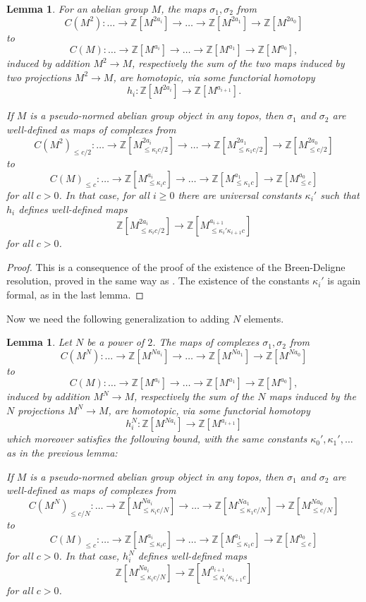 \documentclass[11pt]{amsbook}
\numberwithin{equation}{section}
\numberwithin{theorem}{section}
\newtheorem{lemma}[theorem]{Lemma}
\theoremstyle{definition}
\begin{document}
\begin{lemma}\label{lem:basehomotopy} For an abelian group $M$, the maps $\sigma_1,\sigma_2$ from
\[
C(M^2): \ldots \to \mathbb Z[M^{2a_i}]\to\ldots\to\mathbb Z[M^{2a_1}]\to\mathbb Z[M^{2a_0}]
\]
to
\[
C(M): \ldots \to \mathbb Z[M^{a_i}]\to\ldots\to\mathbb Z[M^{a_1}]\to\mathbb Z[M^{a_0}],
\]
induced by addition $M^2\to M$, respectively the sum of the two maps induced by two projections $M^2\to M$, are homotopic, via some functorial homotopy
\[
h_i: \mathbb Z[M^{2a_i}]\to \mathbb Z[M^{a_{i+1}}].
\]

If $M$ is a pseudo-normed abelian group object in any topos, then $\sigma_1$ and $\sigma_2$ are well-defined as maps of complexes from
\[
C(M^2)_{\leq c/2}: \ldots \to \mathbb Z[M^{2a_i}_{\leq \kappa_ic/2}]\to\ldots\to\mathbb
Z[M^{2a_1}_{\leq \kappa_1c/2}]\to\mathbb Z[M^{2a_0}_{\leq c/2}]
\]
to
\[
C(M)_{\leq c}: \ldots \to \mathbb Z[M^{a_i}_{\leq \kappa_ic}]\to\ldots\to\mathbb
Z[M^{a_1}_{\leq \kappa_1c}]\to\mathbb Z[M^{a_0}_{\leq c}]
\]
for all $c>0$. In that case, for all $i\geq 0$ there are universal constants $\kappa_i'$ such that $h_i$ defines well-defined maps
\[
\mathbb Z[M^{2a_i}_{\leq \kappa_ic/2}]\to \mathbb Z[M^{a_{i+1}}_{\leq
\kappa_i'\kappa_{i+1}c}]
\]
for all $c>0$.
\end{lemma}

\begin{proof} This is a consequence of the proof of the existence of the Breen-Deligne resolution, proved in the same way as \cite[Proposition 4.17]{Condensed}. The existence of the constants $\kappa_i'$ is again formal, as in the last lemma.
\end{proof}

Now we need the following generalization to adding $N$ elements.

\begin{lemma}\label{lem:homotopyNelements} Let $N$ be a power of $2$. The maps of complexes $\sigma_1,\sigma_2$ from
\[
C(M^N): \ldots \to \mathbb Z[M^{Na_i}]\to\ldots\to\mathbb Z[M^{Na_1}]\to\mathbb Z[M^{Na_0}]
\]
to
\[
C(M): \ldots \to \mathbb Z[M^{a_i}]\to\ldots\to\mathbb Z[M^{a_1}]\to\mathbb Z[M^{a_0}],
\]
induced by addition $M^N\to M$, respectively the sum of the $N$ maps induced by the $N$ projections $M^N\to M$, are homotopic, via some functorial homotopy
\[
h_i^N: \mathbb Z[M^{Na_i}]\to \mathbb Z[M^{a_{i+1}}]
\]
which moreover satisfies the following bound, with the same constants $\kappa_0',\kappa_1',\ldots$ as in the previous lemma:

If $M$ is a pseudo-normed abelian group object in any topos, then $\sigma_1$ and $\sigma_2$ are well-defined as maps of complexes from
\[
C(M^N)_{\leq c/N}: \ldots \to \mathbb Z[M^{Na_i}_{\leq \kappa_ic/N}]\to\ldots\to\mathbb Z[M^{Na_1}_{\leq \kappa_1c/N}]\to\mathbb Z[M^{Na_0}_{\leq c/N}]
\]
to
\[
C(M)_{\leq c}: \ldots \to \mathbb Z[M^{a_i}_{\leq \kappa_ic}]\to\ldots\to\mathbb Z[M^{a_1}_{\leq \kappa_1c}]\to\mathbb Z[M^{a_0}_{\leq c}]
\]
for all $c>0$. In that case, $h_i^N$ defines well-defined maps
\[
\mathbb Z[M^{Na_i}_{\leq \kappa_ic/N}]\to \mathbb Z[M^{a_{i+1}}_{\leq \kappa_i'\kappa_{i+1}c}]
\]
for all $c>0$.
\end{lemma}
\end{document}
